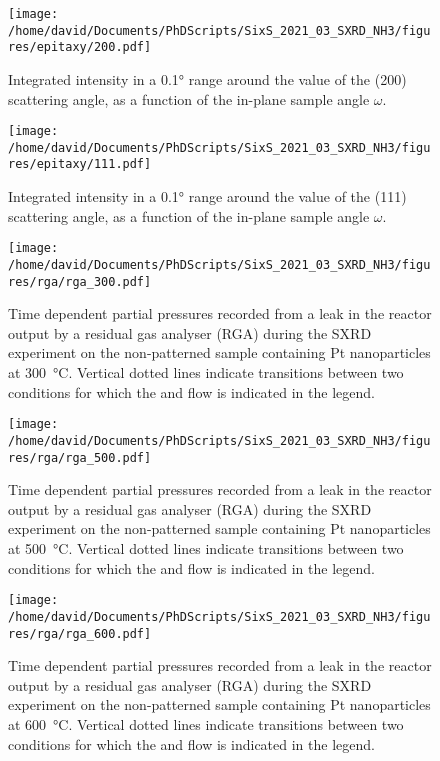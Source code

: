 \begin{figure}[!htb]
    \centering
    \texttt{[image: /home/david/Documents/PhDScripts/SixS\_2021\_03\_SXRD\_NH3/figures/epitaxy/200.pdf]}
    \caption{
        Integrated intensity in a \ang{0.1} range around the value of the (200) scattering angle, as a function of the in-plane sample angle $\omega$.
    }
    \label{fig:Epitaxy200}
\end{figure}

\begin{figure}[!htb]
    \centering
    \texttt{[image: /home/david/Documents/PhDScripts/SixS\_2021\_03\_SXRD\_NH3/figures/epitaxy/111.pdf]}
    \caption{
        Integrated intensity in a \ang{0.1} range around the value of the (111) scattering angle, as a function of the in-plane sample angle $\omega$.
    }
    \label{fig:Epitaxy111}
\end{figure}

\begin{figure}[!htb]
    \centering
    \texttt{[image: /home/david/Documents/PhDScripts/SixS\_2021\_03\_SXRD\_NH3/figures/rga/rga\_300.pdf]}
    \caption{
        Time dependent partial pressures recorded from a leak in the reactor output by a residual gas analyser (RGA) during the SXRD experiment on the non-patterned sample containing Pt nanoparticles at \qty{300}{\degreeCelsius}.
        Vertical dotted lines indicate transitions between two conditions for which the  and  flow is indicated in the legend.
    }
    \label{fig:RGA300SXRDNanoparticles}
\end{figure}

\begin{figure}[!htb]
    \centering
    \texttt{[image: /home/david/Documents/PhDScripts/SixS\_2021\_03\_SXRD\_NH3/figures/rga/rga\_500.pdf]}
    \caption{
        Time dependent partial pressures recorded from a leak in the reactor output by a residual gas analyser (RGA) during the SXRD experiment on the non-patterned sample containing Pt nanoparticles at \qty{500}{\degreeCelsius}.
        Vertical dotted lines indicate transitions between two conditions for which the  and  flow is indicated in the legend.
    }
    \label{fig:RGA500SXRDNanoparticles}
\end{figure}

\begin{figure}[!htb]
    \centering
    \texttt{[image: /home/david/Documents/PhDScripts/SixS\_2021\_03\_SXRD\_NH3/figures/rga/rga\_600.pdf]}
    \caption{
        Time dependent partial pressures recorded from a leak in the reactor output by a residual gas analyser (RGA) during the SXRD experiment on the non-patterned sample containing Pt nanoparticles at \qty{600}{\degreeCelsius}.
        Vertical dotted lines indicate transitions between two conditions for which the  and  flow is indicated in the legend.
    }
    \label{fig:RGA600SXRDNanoparticles}
\end{figure}

